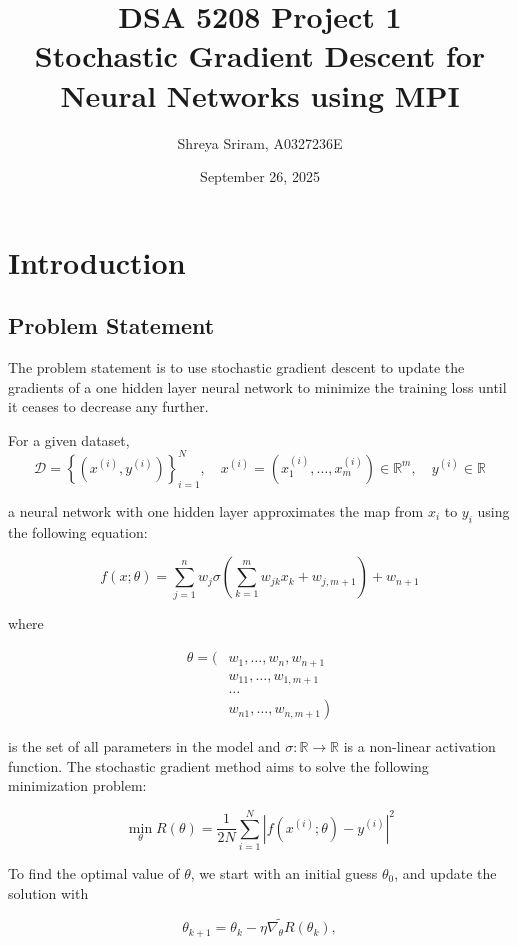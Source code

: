 \documentclass{article}
\title{DSA 5208 Project 1 \\ Stochastic Gradient Descent for Neural Networks using MPI}
\author{Shreya Sriram, A0327236E}
\date{September 26, 2025}
\begin{document}
\maketitle

\section{Introduction}
\subsection{Problem Statement}
The problem statement is to use stochastic gradient descent to update the gradients of a one hidden layer neural network to minimize the training loss until it ceases to decrease any further. 

For a given dataset,
$$
\mathcal{D}=\left\{\left(x^{(i)}, y^{(i)}\right)\right\}_{i=1}^{N}, \quad x^{(i)}=\left(x_{1}^{(i)}, \ldots, x_{m}^{(i)}\right) \in \mathbb{R}^{m}, \quad y^{(i)} \in \mathbb{R}
$$

a neural network with one hidden layer approximates the map from $x_{i}$ to $y_{i}$ using the following equation:

$$
f(x ; \theta)=\sum_{j=1}^{n} w_{j} \sigma\left(\sum_{k=1}^{m} w_{j k} x_{k}+w_{j, m+1}\right)+w_{n+1}
$$

where

$$
\begin{aligned}
\theta=( & w_{1}, \ldots, w_{n}, w_{n+1} \\
& w_{11}, \ldots, w_{1, m+1} \\
& \ldots \\
& \left.w_{n 1}, \ldots, w_{n, m+1}\right)
\end{aligned}
$$

is the set of all parameters in the model and $\sigma: \mathbb{R} \rightarrow \mathbb{R}$ is a non-linear activation function. The stochastic gradient method aims to solve the following minimization problem:

$$
\min _{\theta} R(\theta)=\frac{1}{2 N} \sum_{i=1}^{N}\left|f\left(x^{(i)} ; \theta\right)-y^{(i)}\right|^{2}
$$

To find the optimal value of $\theta$, we start with an initial guess $\theta_{0}$, and update the solution with


\begin{equation*}
\theta_{k+1}=\theta_{k}-\eta \widetilde{\nabla_{\theta} R}\left(\theta_{k}\right), \tag{1}
\end{equation*}
\end{document}
